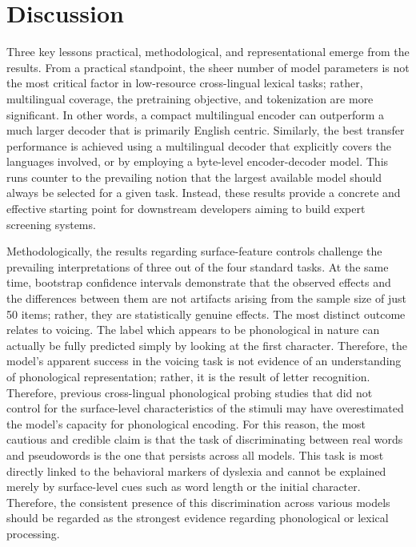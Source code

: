 \documentclass[preprint,12pt]{elsarticle}
\begin{document}
\section{Discussion}
\label{sec:discussion}
Three key lessons practical, methodological, and representational emerge from the results. From a practical standpoint, the sheer number of model parameters is not the most critical factor in low-resource cross-lingual lexical tasks; rather, multilingual coverage, the pretraining objective, and tokenization are more significant. In other words, a compact multilingual encoder can outperform a much larger decoder that is primarily English centric. Similarly, the best transfer performance is achieved using a multilingual decoder that explicitly covers the languages involved, or by employing a byte-level encoder-decoder model. This runs counter to the prevailing notion that the largest available model should always be selected for a given task. Instead, these results provide a concrete and effective starting point for downstream developers aiming to build expert screening systems.

Methodologically, the results regarding surface-feature controls challenge the prevailing interpretations of three out of the four standard tasks. At the same time, bootstrap confidence intervals demonstrate that the observed effects and the differences between them are not artifacts arising from the sample size of just 50 items; rather, they are statistically genuine effects. The most distinct outcome relates to voicing. The label which appears to be phonological in nature can actually be fully predicted simply by looking at the first character. Therefore, the model's apparent success in the voicing task is not evidence of an understanding of phonological representation; rather, it is the result of letter recognition. Therefore, previous cross-lingual phonological probing studies that did not control for the surface-level characteristics of the stimuli may have overestimated the model's capacity for phonological encoding. For this reason, the most cautious and credible claim is that the task of discriminating between real words and pseudowords is the one that persists across all models. This task is most directly linked to the behavioral markers of dyslexia and cannot be explained merely by surface-level cues such as word length or the initial character. Therefore, the consistent presence of this discrimination across various models should be regarded as the strongest evidence regarding phonological or lexical processing.
\end{document}
